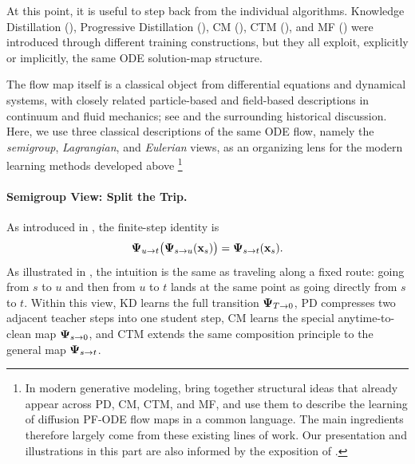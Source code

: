 At this point, it is useful to step back from the individual algorithms.
Knowledge Distillation (), Progressive
Distillation (), CM (), CTM
(), and MF () were introduced through
different training constructions, but they all exploit, explicitly or
implicitly, the same ODE solution-map structure.

The flow map itself is a classical object from differential equations and
dynamical systems, with closely related particle-based and field-based
descriptions in continuum and fluid mechanics; see
 and the surrounding historical discussion.
Here, we use three classical descriptions of the same ODE flow, namely
the \emph{semigroup}, \emph{Lagrangian}, and \emph{Eulerian} views, as an
organizing lens for the modern learning methods developed above%
\footnote{In modern generative modeling, \citet{boffi2024flow} bring together
structural ideas that already appear across PD, CM, CTM, and MF, and use them to
describe the learning of diffusion PF-ODE flow maps in a common language. The
main ingredients therefore largely come from these existing lines of work. Our
presentation and illustrations in this part are also informed by the exposition
of \citet{dieleman2026flowmaps}.}


\paragraph{Semigroup View: Split the Trip.}
As introduced in , the finite-step identity is
\[
{\bm{\Psi}}_{u\to t}\big({\bm{\Psi}}_{s\to u}({\mathbf{x}}_s)\big)
=
{\bm{\Psi}}_{s\to t}({\mathbf{x}}_s).
\]
As illustrated in , the intuition is the same as traveling along a fixed route: going from $s$ to
$u$ and then from $u$ to $t$ lands at the same point as going directly from
$s$ to $t$.  Within this view, KD learns the full transition ${\bm{\Psi}}_{T\to0}$, PD
compresses two adjacent teacher steps into one student step, CM learns the
special anytime-to-clean map ${\bm{\Psi}}_{s\to0}$, and CTM extends the same
composition principle to the general map ${\bm{\Psi}}_{s\to t}$.

